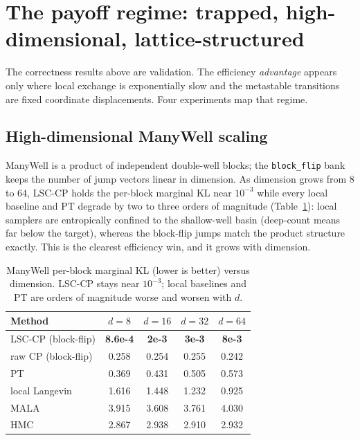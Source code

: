 \section{The payoff regime: trapped, high-dimensional, lattice-structured}
\label{sec:move4}

The correctness results above are validation. The efficiency \emph{advantage} appears only where
local exchange is exponentially slow and the metastable transitions are fixed coordinate
displacements. Four experiments map that regime.

\subsection{High-dimensional ManyWell scaling}
ManyWell is a product of independent double-well blocks; the \texttt{block\_flip} bank keeps the
number of jump vectors linear in dimension. As dimension grows from $8$ to $64$, LSC-CP holds the
per-block marginal KL near $10^{-3}$ while every local baseline and PT degrade by two to three
orders of magnitude (Table~\ref{tab:move4-manywell}): local samplers are entropically confined to
the shallow-well basin (deep-count means far below the target), whereas the block-flip jumps match
the product structure exactly. This is the clearest efficiency win, and it grows with dimension.

\begin{table}[t]
\centering\small
\caption{ManyWell per-block marginal KL (lower is better) versus dimension. LSC-CP stays near
$10^{-3}$; local baselines and PT are orders of magnitude worse and worsen with $d$.}
\label{tab:move4-manywell}
\begin{tabular}{lcccc}
\toprule
Method & $d{=}8$ & $d{=}16$ & $d{=}32$ & $d{=}64$ \\
\midrule
LSC-CP (block-flip) & \textbf{8.6e-4} & \textbf{2e-3} & \textbf{3e-3} & \textbf{8e-3} \\
raw CP (block-flip)  & 0.258 & 0.254 & 0.255 & 0.242 \\
PT                   & 0.369 & 0.431 & 0.505 & 0.573 \\
local Langevin       & 1.616 & 1.448 & 1.232 & 0.925 \\
MALA                 & 3.915 & 3.608 & 3.761 & 4.030 \\
HMC                  & 2.867 & 2.938 & 2.910 & 2.932 \\
\bottomrule
\end{tabular}
\end{table}

